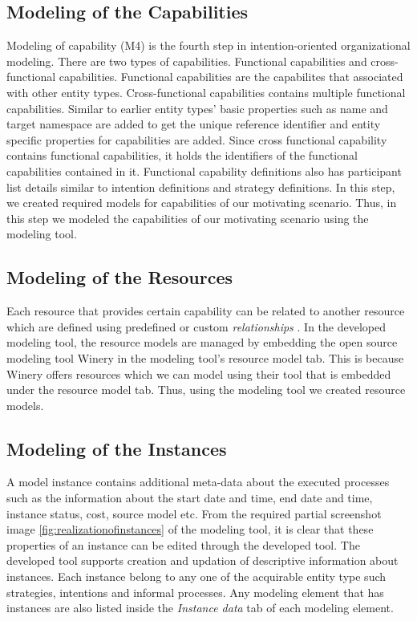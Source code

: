 \subsection{Modeling of the Capabilities}
Modeling of capability (M4) is the fourth step in intention-oriented organizational modeling. There are two types of capabilities. Functional capabilities and cross-functional capabilities. Functional capabilities are the capabilites that associated with other entity types. Cross-functional capabilities contains multiple functional capabilities. Similar to earlier entity types' basic properties such as name and target namespace are added to get the unique reference identifier and entity specific properties for capabilities are added. Since cross functional capability contains functional capabilities, it holds the identifiers of the functional capabilities contained in it. Functional capability definitions also has participant list details similar to intention definitions and strategy definitions. In this step, we created required models for capabilities of our motivating scenario. Thus, in this step we modeled the capabilities of our motivating scenario using the modeling tool. 

\subsection{Modeling of the Resources}
Each resource that provides certain capability can be related to another resource which are defined using predefined or custom \textit{relationships} \cite{Sungur2014a}. In the developed modeling tool, the resource models are managed by embedding the open source modeling tool Winery \cite{Kopp2013} in the modeling tool's resource model tab. This is because Winery offers resources which we can model using their tool that is embedded under the resource model tab. Thus, using the modeling tool we created resource models. 

\subsection{Modeling of the Instances}
 A model instance contains additional meta-data about the executed processes such as the information about the start date and time, end date and time, instance status, cost, source model etc. From the required partial screenshot image \ref{fig:realizationofinstances} of the modeling tool, it is clear that these properties of an instance can be edited through the developed tool. The developed tool supports creation and updation of descriptive information about instances. Each instance belong to any one of the acquirable entity type such strategies, intentions and informal processes. Any modeling element that has instances are also listed inside the \textit{Instance data} tab of each modeling element.  
 
